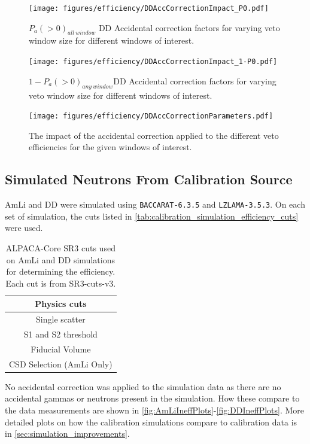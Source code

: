 \begin{figure}
    \centering
    \texttt{[image: figures/efficiency/DDAccCorrectionImpact\_P0.pdf]}
    \caption{$P_a(>0)_{all\:window}$ DD Accidental correction factors for varying veto window size for different windows of interest.}
    \label{fig:DDAccCorrectionImpact_P0}
\end{figure}

\begin{figure}
    \centering
    \texttt{[image: figures/efficiency/DDAccCorrectionImpact\_1-P0.pdf]}
    \caption{$1-P_a(>0)_{any\:window}$DD Accidental correction factors for varying veto window size for different windows of interest.}
    \label{fig:figures/efficiency/DDAccCorrectionImpact_1-P0}
\end{figure}

\begin{figure}
    \centering
    \texttt{[image: figures/efficiency/DDAccCorrectionParameters.pdf]}
    \caption{The impact of the accidental correction applied to the different veto efficiencies for the given windows of interest.}
    \label{fig:figures/efficiency/DDAccCorrectionParameters}
\end{figure}



\subsection{Simulated Neutrons From Calibration Source}
AmLi and DD were simulated using \lstinline{BACCARAT-6.3.5} and \lstinline{LZLAMA-3.5.3}.
On each set of simulation, the cuts listed in \autoref{tab:calibration_simulation_efficiency_cuts} were used.
\begin{table}
    \centering
    \begin{tabular}{c}
     Physics cuts  \\
     \hline
     Single scatter \\
     S1 and S2 threshold \\
     Fiducial Volume \\
     CSD Selection (AmLi Only)\\
    \end{tabular}
    \caption{ALPACA-Core SR3 cuts used on AmLi and DD simulations for determining the efficiency. Each cut is from SR3-cuts-v3.}
    \label{tab:calibration_simulation_efficiency_cuts}
\end{table}
No accidental correction was applied to the simulation data as there are no accidental gammas or neutrons present in the simulation.
How these compare to the data measurements are shown in \autoref{fig:AmLiIneffPlots}-\ref{fig:DDIneffPlots}.
More detailed plots on how the calibration simulations compare to calibration data is in \autoref{sec:simulation_improvements}.

